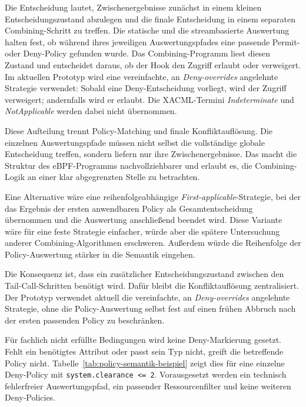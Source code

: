 Die Entscheidung lautet, Zwischenergebnisse zunächst in einem kleinen Entscheidungszustand abzulegen und die finale Entscheidung in einem separaten Combining-Schritt zu treffen.
Die statische und die streambasierte Auswertung halten fest, ob während ihres jeweiligen Auswertungspfades eine passende Permit- oder Deny-Policy gefunden wurde.
Das Combining-Programm liest diesen Zustand und entscheidet daraus, ob der Hook den Zugriff erlaubt oder verweigert.
Im aktuellen Prototyp wird eine vereinfachte, an \textit{Deny-overrides} angelehnte Strategie
verwendet: Sobald eine Deny-Entscheidung vorliegt, wird der Zugriff verweigert; andernfalls wird er
erlaubt. Die XACML-Termini \textit{Indeterminate} und \textit{NotApplicable} werden dabei nicht
übernommen.

Diese Aufteilung trennt Policy-Matching und finale Konfliktauflösung.
Die einzelnen Auswertungspfade müssen nicht selbst die vollständige globale Entscheidung treffen, sondern liefern nur ihre Zwischenergebnisse.
Das macht die Struktur des eBPF-Programms nachvollziehbarer und erlaubt es, die Combining-Logik an einer klar abgegrenzten Stelle zu betrachten.

Eine Alternative wäre eine reihenfolgeabhängige \textit{First-applicable}-Strategie, bei der das
Ergebnis der ersten anwendbaren Policy als Gesamtentscheidung übernommen und die Auswertung
anschließend beendet wird.
Diese Variante wäre für eine feste Strategie einfacher, würde aber die spätere Untersuchung anderer Combining-Algorithmen erschweren.
Außerdem würde die Reihenfolge der Policy-Auswertung stärker in die Semantik eingehen.

Die Konsequenz ist, dass ein zusätzlicher Entscheidungszustand zwischen den Tail-Call-Schritten benötigt wird.
Dafür bleibt die Konfliktauflösung zentralisiert.
Der Prototyp verwendet aktuell die vereinfachte, an \textit{Deny-overrides} angelehnte Strategie,
ohne die Policy-Auswertung selbst fest auf einen frühen Abbruch nach der ersten passenden Policy zu
beschränken.


Für fachlich nicht erfüllte Bedingungen wird keine Deny-Markierung gesetzt. Fehlt ein benötigtes Attribut oder passt sein Typ nicht, greift die betreffende Policy nicht. Tabelle~\ref{tab:policy-semantik-beispiel} zeigt dies für eine einzelne Deny-Policy mit \texttt{system.clearance <= 2}. Vorausgesetzt werden ein technisch fehlerfreier Auswertungspfad, ein passender Ressourcenfilter und keine weiteren Deny-Policies.

